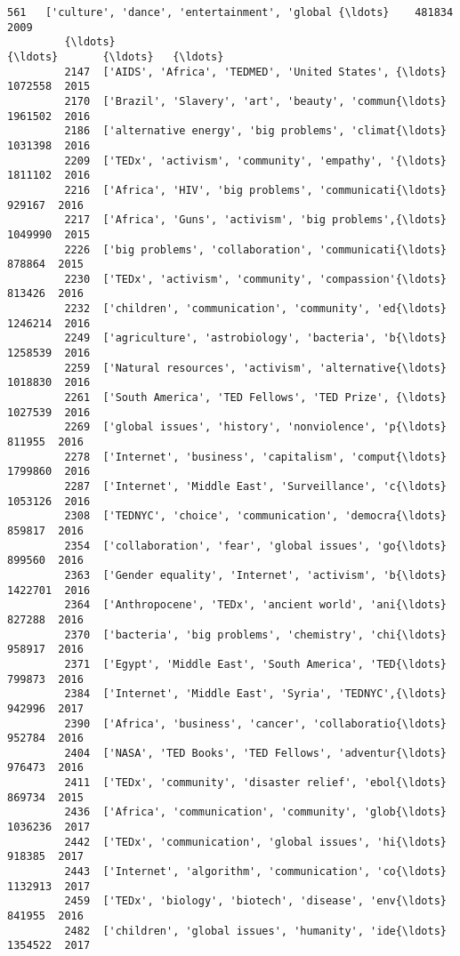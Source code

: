 \documentclass[11pt]{article}
\begin{document}
\begin{Verbatim}[commandchars=\\\{\}]
         561   ['culture', 'dance', 'entertainment', 'global {\ldots}    481834  2009   
         {\ldots}                                                 {\ldots}       {\ldots}   {\ldots}   
         2147  ['AIDS', 'Africa', 'TEDMED', 'United States', {\ldots}   1072558  2015   
         2170  ['Brazil', 'Slavery', 'art', 'beauty', 'commun{\ldots}   1961502  2016   
         2186  ['alternative energy', 'big problems', 'climat{\ldots}   1031398  2016   
         2209  ['TEDx', 'activism', 'community', 'empathy', '{\ldots}   1811102  2016   
         2216  ['Africa', 'HIV', 'big problems', 'communicati{\ldots}    929167  2016   
         2217  ['Africa', 'Guns', 'activism', 'big problems',{\ldots}   1049990  2015   
         2226  ['big problems', 'collaboration', 'communicati{\ldots}    878864  2015   
         2230  ['TEDx', 'activism', 'community', 'compassion'{\ldots}    813426  2016   
         2232  ['children', 'communication', 'community', 'ed{\ldots}   1246214  2016   
         2249  ['agriculture', 'astrobiology', 'bacteria', 'b{\ldots}   1258539  2016   
         2259  ['Natural resources', 'activism', 'alternative{\ldots}   1018830  2016   
         2261  ['South America', 'TED Fellows', 'TED Prize', {\ldots}   1027539  2016   
         2269  ['global issues', 'history', 'nonviolence', 'p{\ldots}    811955  2016   
         2278  ['Internet', 'business', 'capitalism', 'comput{\ldots}   1799860  2016   
         2287  ['Internet', 'Middle East', 'Surveillance', 'c{\ldots}   1053126  2016   
         2308  ['TEDNYC', 'choice', 'communication', 'democra{\ldots}    859817  2016   
         2354  ['collaboration', 'fear', 'global issues', 'go{\ldots}    899560  2016   
         2363  ['Gender equality', 'Internet', 'activism', 'b{\ldots}   1422701  2016   
         2364  ['Anthropocene', 'TEDx', 'ancient world', 'ani{\ldots}    827288  2016   
         2370  ['bacteria', 'big problems', 'chemistry', 'chi{\ldots}    958917  2016   
         2371  ['Egypt', 'Middle East', 'South America', 'TED{\ldots}    799873  2016   
         2384  ['Internet', 'Middle East', 'Syria', 'TEDNYC',{\ldots}    942996  2017   
         2390  ['Africa', 'business', 'cancer', 'collaboratio{\ldots}    952784  2016   
         2404  ['NASA', 'TED Books', 'TED Fellows', 'adventur{\ldots}    976473  2016   
         2411  ['TEDx', 'community', 'disaster relief', 'ebol{\ldots}    869734  2015   
         2436  ['Africa', 'communication', 'community', 'glob{\ldots}   1036236  2017   
         2442  ['TEDx', 'communication', 'global issues', 'hi{\ldots}    918385  2017   
         2443  ['Internet', 'algorithm', 'communication', 'co{\ldots}   1132913  2017   
         2459  ['TEDx', 'biology', 'biotech', 'disease', 'env{\ldots}    841955  2016   
         2482  ['children', 'global issues', 'humanity', 'ide{\ldots}   1354522  2017   
         

\end{Verbatim}
\end{document}
